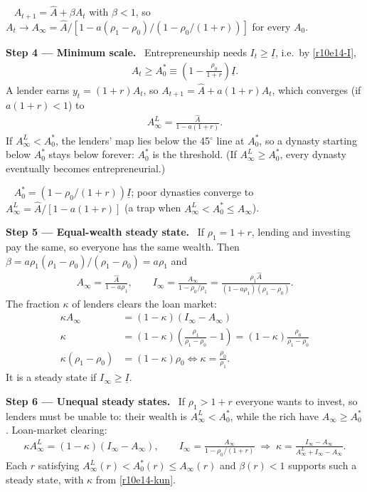 \documentclass[11pt,a4paper]{article}
\newcommand{\step}[2]{\par\medskip\noindent\textbf{Step #1 --- #2.}~}
\newcommand{\answer}[1]{\par\smallskip\noindent\fbox{\textbf{Answer\if\relax\detokenize{#1}\relax\else\ #1\fi.}}~}
\begin{document}
\answer{(ii)} $A_{t+1}=\hat A+\beta A_t$ with $\beta<1$, so $A_t\to A_\infty=\hat A/[1-a(\rho_1-\rho_0)/(1-\rho_0/(1+r))]$ for every $A_0$.

\step{4}{Minimum scale} Entrepreneurship needs $I_t\geq\underline I$, i.e.\ by \eqref{r10e14-I},
\begin{align}
  A_t\geq A_0^*\equiv\left(1-\frac{\rho_0}{1+r}\right)\underline I. \label{r10e14-A0}
\end{align}
A lender earns $y_t=(1+r)A_t$, so $A_{t+1}=\hat A+a(1+r)A_t$, which converges (if $a(1+r)<1$) to
\begin{align}
  A_\infty^L = \frac{\hat A}{1-a(1+r)}. \label{r10e14-AL}
\end{align}
If $A_\infty^L<A_0^*$, the lenders' map lies below the 45$^\circ$ line at $A_0^*$, so a dynasty starting below $A_0^*$ stays below forever: $A_0^*$ is the threshold. (If $A_\infty^L\geq A_0^*$, every dynasty eventually becomes entrepreneurial.)

\answer{(iii)} $A_0^*=(1-\rho_0/(1+r))\underline I$; poor dynasties converge to $A_\infty^L=\hat A/[1-a(1+r)]$ (a trap when $A_\infty^L<A_0^*\leq A_\infty$).

\step{5}{Equal-wealth steady state} If $\rho_1=1+r$, lending and investing pay the same, so everyone has the same wealth. Then $\beta=a\rho_1(\rho_1-\rho_0)/(\rho_1-\rho_0)=a\rho_1$ and
\begin{align}
  A_\infty = \frac{\hat A}{1-a\rho_1}, \qquad I_\infty=\frac{A_\infty}{1-\rho_0/\rho_1}=\frac{\rho_1\hat A}{(1-a\rho_1)(\rho_1-\rho_0)}. \label{r10e14-eq}
\end{align}
The fraction $\kappa$ of lenders clears the loan market:
\begin{align}
  \kappa A_\infty &= (1-\kappa)(I_\infty-A_\infty) \nonumber\\
  \kappa &= (1-\kappa)\left(\frac{\rho_1}{\rho_1-\rho_0}-1\right) = (1-\kappa)\frac{\rho_0}{\rho_1-\rho_0} \nonumber\\
  \kappa(\rho_1-\rho_0) &= (1-\kappa)\rho_0 \iff \kappa=\frac{\rho_0}{\rho_1}. \label{r10e14-keq}
\end{align}
It is a steady state if $I_\infty\geq\underline I$.

\step{6}{Unequal steady states} If $\rho_1>1+r$ everyone wants to invest, so lenders must be unable to: their wealth is $A_\infty^L<A_0^*$, while the rich have $A_\infty\geq A_0^*$. Loan-market clearing:
\begin{align}
  \kappa A_\infty^L = (1-\kappa)(I_\infty-A_\infty), \qquad I_\infty=\frac{A_\infty}{1-\rho_0/(1+r)} \;\Longrightarrow\; \kappa=\frac{I_\infty-A_\infty}{A_\infty^L+I_\infty-A_\infty}. \label{r10e14-kun}
\end{align}
Each $r$ satisfying $A_\infty^L(r)<A_0^*(r)\leq A_\infty(r)$ and $\beta(r)<1$ supports such a steady state, with $\kappa$ from \eqref{r10e14-kun}.
\end{document}
